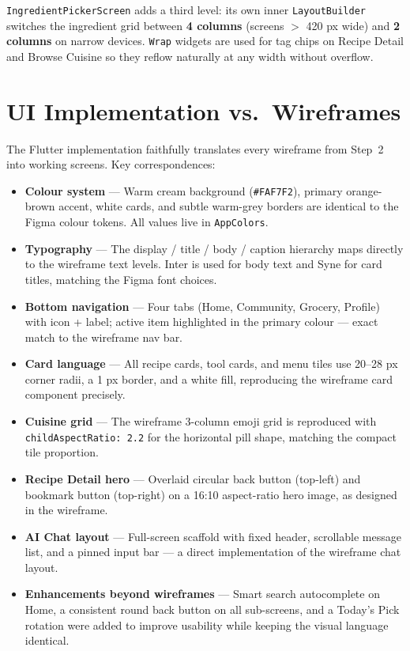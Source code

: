 \documentclass[11pt,a4paper]{article}
\begin{document}
\texttt{IngredientPickerScreen} adds a third level: its own inner \texttt{LayoutBuilder} switches the ingredient grid between \textbf{4 columns} (screens $>$ 420 px wide) and \textbf{2 columns} on narrow devices. \texttt{Wrap} widgets are used for tag chips on Recipe Detail and Browse Cuisine so they reflow naturally at any width without overflow.

\section{UI Implementation vs.\ Wireframes}

The Flutter implementation faithfully translates every wireframe from Step~2 into working screens. Key correspondences:

\begin{itemize}
  \item \textbf{Colour system} — Warm cream background (\texttt{\#FAF7F2}), primary orange-brown accent, white cards, and subtle warm-grey borders are identical to the Figma colour tokens. All values live in \texttt{AppColors}.
  \item \textbf{Typography} — The display / title / body / caption hierarchy maps directly to the wireframe text levels. Inter is used for body text and Syne for card titles, matching the Figma font choices.
  \item \textbf{Bottom navigation} — Four tabs (Home, Community, Grocery, Profile) with icon + label; active item highlighted in the primary colour — exact match to the wireframe nav bar.
  \item \textbf{Card language} — All recipe cards, tool cards, and menu tiles use 20–28 px corner radii, a 1 px border, and a white fill, reproducing the wireframe card component precisely.
  \item \textbf{Cuisine grid} — The wireframe 3-column emoji grid is reproduced with \texttt{childAspectRatio: 2.2} for the horizontal pill shape, matching the compact tile proportion.
  \item \textbf{Recipe Detail hero} — Overlaid circular back button (top-left) and bookmark button (top-right) on a 16:10 aspect-ratio hero image, as designed in the wireframe.
  \item \textbf{AI Chat layout} — Full-screen scaffold with fixed header, scrollable message list, and a pinned input bar — a direct implementation of the wireframe chat layout.
  \item \textbf{Enhancements beyond wireframes} — Smart search autocomplete on Home, a consistent round back button on all sub-screens, and a Today's Pick rotation were added to improve usability while keeping the visual language identical.
\end{itemize}
\end{document}
